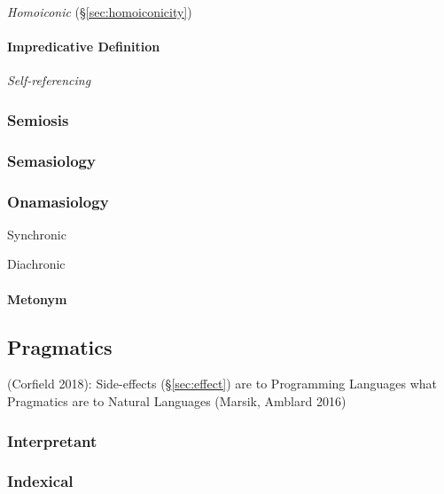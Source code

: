 \emph{Homoiconic} (\S\ref{sec:homoiconicity})



\paragraph{Impredicative Definition}\label{sec:impredicative_definition}\hfill

\emph{Self-referencing}



\subsubsection{Semiosis}\label{sec:semiosis}

\subsubsection{Semasiology}\label{sec:semasiology}

\subsubsection{Onamasiology}\label{sec:onamasiology}

Synchronic

Diachronic

\paragraph{Metonym}\label{sec:metonym}\hfill



\subsection{Pragmatics}\label{sec:pragmatics}

(Corfield 2018): Side-effects (\S\ref{sec:effect}) are to Programming Languages
what Pragmatics are to Natural Languages (Marsik, Amblard 2016)



\subsubsection{Interpretant}\label{sec:interpretant}

\subsubsection{Indexical}\label{sec:indexical}

